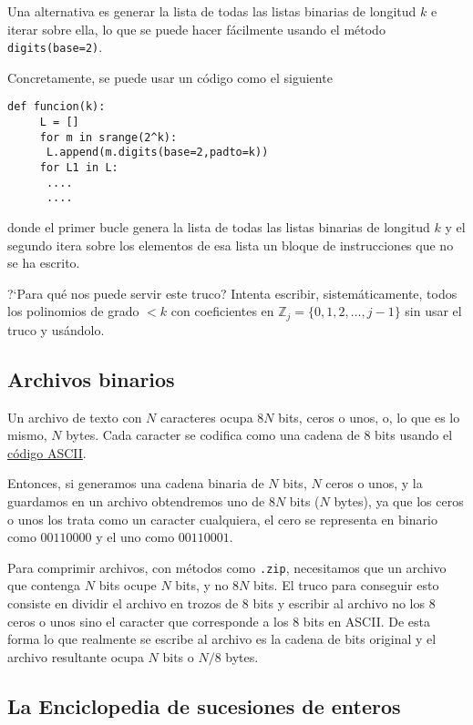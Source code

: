 Una alternativa es generar la  lista de todas las listas binarias de longitud
$k$ e iterar sobre ella, lo que se puede hacer f\'acilmente usando el m\'etodo
\lstinline|digits(base=2)|. 

Concretamente, se puede usar un c\'odigo como el siguiente

\begin{lstlisting}[columns=spaceflexible]
def funcion(k):
     L = []
     for m in srange(2^k):
	  L.append(m.digits(base=2,padto=k))
     for L1 in L:
	  ....
	  ....
\end{lstlisting}
donde el primer bucle genera la lista de todas las listas binarias de
longitud $k$ y el segundo itera sobre los elementos de esa lista un bloque de
instrucciones que no se ha escrito. 


?`Para qu\'e nos puede servir este truco? Intenta escribir, sistem\'aticamente, 
todos los polinomios de grado $<k$ con coeficientes en
$\mathbb{Z}_j=\{0,1,2,\dots,j-1\}$ sin usar el truco y us\'andolo.

\subsection{Archivos binarios}
Un archivo de texto con $N$ caracteres ocupa $8N$ bits, ceros o unos, o, lo que
es lo mismo, $N$ bytes. Cada caracter se codifica como una cadena de $8$ bits
usando el \href{http://en.wikipedia.org/wiki/ASCII}{c\'odigo ASCII}.

Entonces, si generamos una cadena binaria de $N$ bits, $N$ ceros o unos, y la
guardamos en un archivo obtendremos uno de $8N$ bits ($N$ bytes), ya que los
ceros o unos los trata como un caracter cualquiera, el cero se representa en
binario como $00110000$ y el uno como $00110001$.

Para comprimir archivos, con m\'etodos como {\tt .zip}, necesitamos que un
archivo que contenga $N$ bits ocupe $N$ bits, y no $8N$ bits. El truco para
conseguir esto consiste en dividir el archivo en trozos de $8$ bits y escribir
al archivo {\sc no los $8$ ceros o unos} sino el caracter que corresponde a los
$8$ bits en ASCII. De esta forma lo que realmente se escribe al archivo es la
cadena de bits original y el archivo resultante ocupa $N$ bits o $N/8$ bytes. 

\subsection{La Enciclopedia de sucesiones de enteros}

